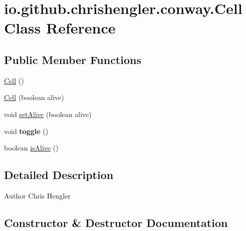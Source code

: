 \hypertarget{classio_1_1github_1_1chrishengler_1_1conway_1_1_cell}{}\section{io.\+github.\+chrishengler.\+conway.\+Cell Class Reference}
\label{classio_1_1github_1_1chrishengler_1_1conway_1_1_cell}
\subsection*{Public Member Functions}
\begin{DoxyCompactItemize}
\item 
\hyperlink{classio_1_1github_1_1chrishengler_1_1conway_1_1_cell_aebac2efd98126a93655bcb52043ae158}{Cell} ()
\item 
\hyperlink{classio_1_1github_1_1chrishengler_1_1conway_1_1_cell_ac93c3921810b8440b46384c364dfb941}{Cell} (boolean alive)
\item 
void \hyperlink{classio_1_1github_1_1chrishengler_1_1conway_1_1_cell_afd2b3126a3cac2f77857efaa34fe8ba3}{set\+Alive} (boolean alive)
\item 
void {\bfseries toggle} ()\hypertarget{classio_1_1github_1_1chrishengler_1_1conway_1_1_cell_a30841f0b9b9c4c5b5d2637f0ea9fe197}{}\label{classio_1_1github_1_1chrishengler_1_1conway_1_1_cell_a30841f0b9b9c4c5b5d2637f0ea9fe197}

\item 
boolean \hyperlink{classio_1_1github_1_1chrishengler_1_1conway_1_1_cell_a0b522d80bc26dbd497b5b4192de653eb}{is\+Alive} ()
\end{DoxyCompactItemize}


\subsection{Detailed Description}
\begin{DoxyAuthor}{Author}
Chris Hengler 
\end{DoxyAuthor}


\subsection{Constructor \& Destructor Documentation}
